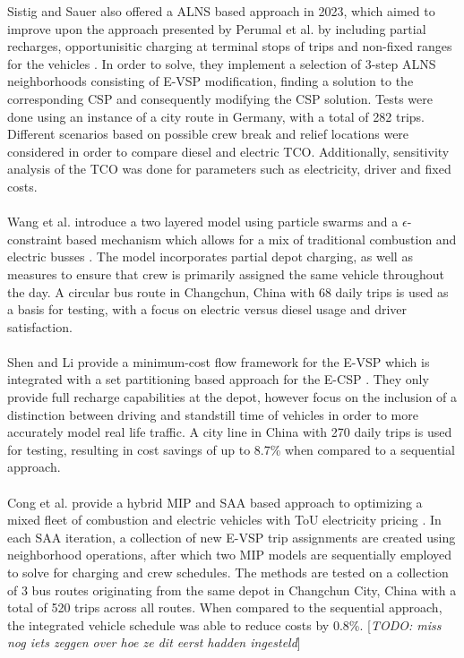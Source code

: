 \documentclass[ht]{article}
\newcommand{\todo}[1]{{\color{red}[\textit{TODO: #1}]}}
\begin{document}
Sistig and Sauer also offered a ALNS based approach in 2023, which aimed to
improve upon the approach presented by Perumal et al. by including partial
recharges, opportunisitic charging at terminal stops of trips and non-fixed
ranges for the vehicles \cite{Sistig2023}. In order to solve, they implement a
selection of 3-step ALNS neighborhoods consisting of E-VSP modification,
finding a solution to the corresponding CSP and consequently modifying the CSP
solution. Tests were done using an instance of a city route in Germany, with a
total of 282 trips. Different scenarios based on possible crew break and relief
locations were considered in order to compare diesel and electric TCO.
Additionally, sensitivity analysis of the TCO was done for parameters such as
electricity, driver and fixed costs. \\\\

Wang et al. introduce a two layered model using particle swarms and a
$\epsilon$-constraint based mechanism which allows for a mix of traditional
combustion and electric busses \cite{Wang2022}. The model incorporates partial
depot charging, as well as measures to ensure that crew is primarily assigned
the same vehicle throughout the day. A circular bus route in Changchun, China
with 68 daily trips is used as a basis for testing, with a focus on electric
versus diesel usage and driver satisfaction. \\\\

Shen and Li provide a minimum-cost flow framework for the E-VSP which is
integrated with a set partitioning based approach for the E-CSP
\cite{Shen2023}. They only provide full recharge capabilities at the depot,
however focus on the inclusion of a distinction between driving and standstill
time of vehicles in order to more accurately model real life traffic. A city
line in China with 270 daily trips is used for testing, resulting in cost
savings of up to 8.7\% when compared to a sequential approach. \\\\

Cong et al. provide a hybrid MIP and SAA based approach to optimizing a mixed fleet of combustion and electric vehicles with ToU electricity pricing \cite{Cong2024}. In each SAA iteration, a collection of new E-VSP trip assignments are created using neighborhood operations, after which two MIP models are sequentially employed to solve for charging and crew schedules. The methods are tested on a collection of 3 bus routes originating from the same depot in Changchun City, China with a total of 520 trips across all routes. When compared to the sequential approach, the integrated vehicle schedule was able to reduce costs by 0.8\%. \todo{miss nog iets zeggen over hoe ze dit eerst hadden ingesteld} \\\\
\end{document}

